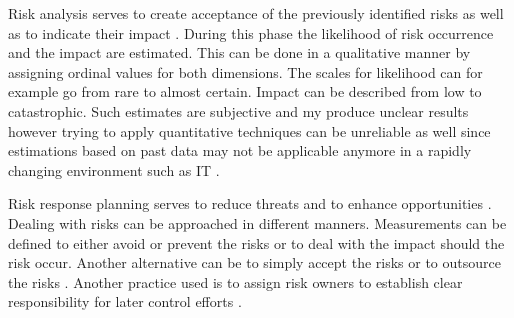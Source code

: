 Risk analysis serves to create acceptance of the previously identified risks as well as to indicate their impact \cite{didragaRoleEffectsRisk2013}. During this phase the likelihood of risk occurrence and the impact are estimated. This can be done in a qualitative manner by assigning ordinal values for both dimensions. The scales for likelihood can for example go from rare to almost certain. Impact can be described from low to catastrophic. Such estimates are subjective and my produce unclear results however trying to apply quantitative techniques can be unreliable as well since estimations based on past data may not be applicable anymore in a rapidly changing environment such as IT \cite{islamSoftwareDevelopmentRisk2011}.

Risk response planning serves to reduce threats and to enhance opportunities \cite{teschITProjectRisk2007}. Dealing with risks can be approached in different manners. Measurements can be defined to either avoid or prevent the risks or to deal with the impact should the risk occur. Another alternative can be to simply accept the risks or to outsource the risks \cite{islamSoftwareDevelopmentRisk2011}. Another practice used is to assign risk owners to establish clear responsibility for later control efforts \cite{peixotoProjectRiskManagement2014}.

